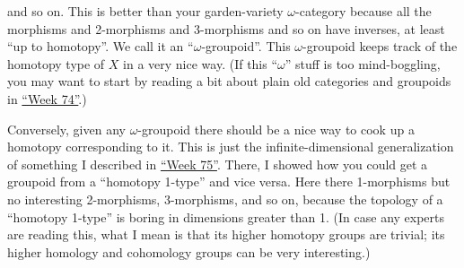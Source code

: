 \documentclass{article}
\begin{document}
\begin{itemize}
  and so on. This is better than your garden-variety \(\omega\)-category
  because all the morphisms and 2-morphisms and 3-morphisms and so on
  have inverses, at least ``up to homotopy''. We call it an
  ``\(\omega\)-groupoid''. This \(\omega\)-groupoid keeps track of the
  homotopy type of \(X\) in a very nice way. (If this ``\(\omega\)''
  stuff is too mind-boggling, you may want to start by reading a bit
  about plain old categories and groupoids in
  \protect\hyperlink{week74}{``Week 74''}.)

  Conversely, given any \(\omega\)-groupoid there should be a nice way
  to cook up a homotopy corresponding to it. This is just the
  infinite-dimensional generalization of something I described in
  \protect\hyperlink{week75}{``Week 75''}. There, I showed how you could
  get a groupoid from a ``homotopy 1-type'' and vice versa. Here there
  1-morphisms but no interesting 2-morphisms, 3-morphisms, and so on,
  because the topology of a ``homotopy 1-type'' is boring in dimensions
  greater than 1. (In case any experts are reading this, what I mean is
  that its higher homotopy groups are trivial; its higher homology and
  cohomology groups can be very interesting.)


\end{itemize}
\end{document}
